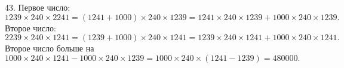 43. Первое число: $1239\times240\times2241=(1241+1000)\times240\times1239=1241\times240\times1239+1000\times240\times1239.$ Второе число: $2239\times240\times1241=(1239+1000)\times240\times1241=
1239\times240\times1241+1000\times240\times1241.$ Второе число больше на
 $1000\times240\times1241-1000\times240\times1239=1000\times240\times(1241-1239)=480000.$\\
